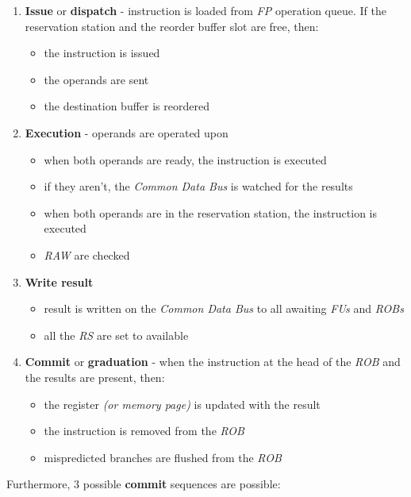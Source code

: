 \documentclass[english]{article}
\begin{document}
\begin{enumerate}
  \item \textbf{Issue} or \textbf{dispatch} - instruction is loaded from \textit{FP} operation queue. If the reservation station and the reorder buffer slot are free, then:
        \begin{itemize}
          \item the instruction is issued
          \item the operands are sent
          \item the destination buffer is reordered
        \end{itemize}
  \item \textbf{Execution} - operands are operated upon
        \begin{itemize}
          \item when both operands are ready, the instruction is executed
          \item if they aren't, the \textit{Common Data Bus} is watched for the results
          \item when both operands are in the reservation station, the instruction is executed
          \item \textit{RAW} are checked
        \end{itemize}
  \item \textbf{Write result}
        \begin{itemize}
          \item result is written on the \textit{Common Data Bus} to all awaiting \textit{FUs} and \textit{ROBs}
          \item all the \textit{RS} are set to available
        \end{itemize}
  \item \textbf{Commit} or \textbf{graduation} - when the instruction at the head of the \textit{ROB} and the results are present, then:
        \begin{itemize}
          \item the register \textit{(or memory page)} is updated with the result
          \item the instruction is removed from the \textit{ROB}
          \item mispredicted branches are flushed from the \textit{ROB}
        \end{itemize}
\end{enumerate}

Furthermore, \(3\) possible \textbf{commit} sequences are possible:
\end{document}
